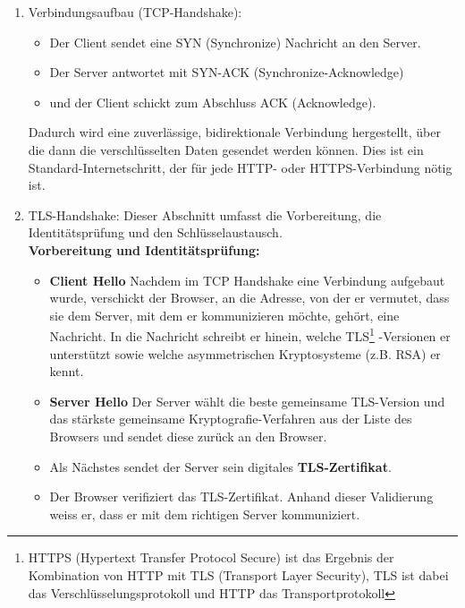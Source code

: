         \begin{enumerate}
            \item Verbindungsaufbau (TCP-Handshake): 
            \begin{itemize} 
                \item Der Client sendet eine SYN (Synchronize) Nachricht an den Server. 
                \item Der Server antwortet mit SYN-ACK (Synchronize-Acknowledge) 
                \item und der Client schickt zum Abschluss ACK (Acknowledge). 
            \end{itemize} 
            Dadurch wird eine zuverlässige, bidirektionale Verbindung hergestellt, über die dann die verschlüsselten Daten gesendet werden können. Dies ist ein Standard-Internetschritt, der für jede HTTP- oder HTTPS-Verbindung nötig ist.
            \item TLS-Handshake: Dieser Abschnitt umfasst die Vorbereitung, die Identitätsprüfung und den Schlüsselaustausch.\\
            \textbf{Vorbereitung und Identitätsprüfung:}
            \begin{itemize}
                \item \textbf{Client Hello} Nachdem im TCP Handshake eine Verbindung aufgebaut wurde, verschickt der Browser, an die Adresse, von der er vermutet, dass sie dem Server, mit dem er kommunizieren möchte, gehört, eine Nachricht. In die Nachricht schreibt er hinein, welche TLS\footnote{HTTPS (Hypertext Transfer Protocol Secure) ist das Ergebnis der Kombination von HTTP mit TLS (Transport Layer Security), TLS ist dabei das Verschlüsselungsprotokoll und HTTP das Transportprotokoll} -Versionen er unterstützt sowie welche asymmetrischen Kryptosysteme (z.B. RSA) er kennt.
                \item \textbf{Server Hello} Der Server wählt die beste gemeinsame TLS-Version und das stärkste gemeinsame Kryptografie-Verfahren aus der Liste des Browsers und sendet diese zurück an den Browser.
                \item Als Nächstes sendet der Server sein digitales \textbf{TLS-Zertifikat}.
                \item Der Browser verifiziert das TLS-Zertifikat. Anhand dieser Validierung weiss er, dass er mit dem richtigen Server kommuniziert.
            \end{itemize}


\end{enumerate}
